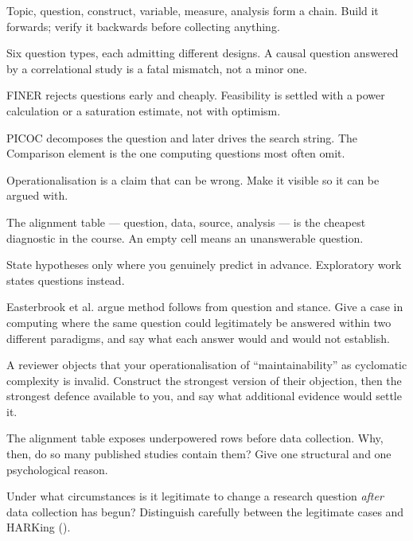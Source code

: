 \begin{chaptersummary}
\begin{tight}
  \item Topic, question, construct, variable, measure, analysis form a chain.
    Build it forwards; verify it backwards before collecting anything.
  \item Six question types, each admitting different designs. A causal question
    answered by a correlational study is a fatal mismatch, not a minor one.
  \item FINER rejects questions early and cheaply. Feasibility is settled with
    a power calculation or a saturation estimate, not with optimism.
  \item PICOC decomposes the question and later drives the search string. The
    Comparison element is the one computing questions most often omit.
  \item Operationalisation is a claim that can be wrong. Make it visible so it
    can be argued with.
  \item The alignment table --- question, data, source, analysis --- is the
    cheapest diagnostic in the course. An empty cell means an unanswerable
    question.
  \item State hypotheses only where you genuinely predict in advance.
    Exploratory work states questions instead.
\end{tight}
\end{chaptersummary}

\begin{reviewq}
  \item Easterbrook et al. argue method follows from question and stance. Give
    a case in computing where the same question could legitimately be answered
    within two different paradigms, and say what each answer would and would
    not establish.
  \item A reviewer objects that your operationalisation of ``maintainability''
    as cyclomatic complexity is invalid. Construct the strongest version of
    their objection, then the strongest defence available to you, and say what
    additional evidence would settle it.
  \item The alignment table exposes underpowered rows before data collection.
    Why, then, do so many published studies contain them? Give one structural
    and one psychological reason.
  \item Under what circumstances is it legitimate to change a research question
    \emph{after} data collection has begun? Distinguish carefully between the
    legitimate cases and HARKing ().
\end{reviewq}

